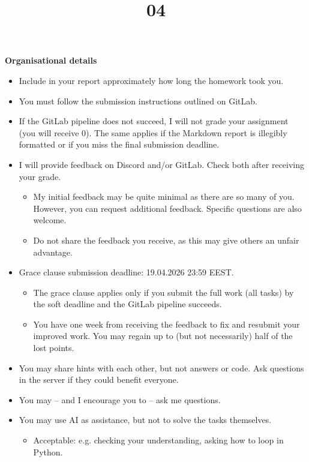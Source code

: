 \documentclass{homework}
\title{04}
\begin{document}
\maketitle

\textbf{Organisational details}

\begin{itemize}
  \item Include in your report approximately how long the homework took you.
  \item You must follow the submission instructions outlined on GitLab.
  \item If the GitLab pipeline does not succeed, I will not grade your assignment (you will receive 0).
  The same applies if the Markdown report is illegibly formatted or if you miss the final submission deadline.
  \item I will provide feedback on Discord and/or GitLab.
  Check both after receiving your grade.
  \begin{itemize}
    \item My initial feedback may be quite minimal as there are so many of you.
    However, you can request additional feedback.
    Specific questions are also welcome.
    \item Do not share the feedback you receive, as this may give others an unfair advantage.
  \end{itemize}
  \item Grace clause submission deadline: 19.04.2026 23:59 EEST.
  \begin{itemize}
    \item The grace clause applies only if you submit the full work (all tasks) by the soft deadline and the GitLab pipeline succeeds.
    \item You have one week from receiving the feedback to fix and resubmit your improved work.
    You may regain up to (but not necessarily) half of the lost points.
  \end{itemize}
  \item You may share hints with each other, but not answers or code.
  Ask questions in the server if they could benefit everyone.
  \item You may -- and I encourage you to -- ask me questions.
  \item You may use AI as assistance, but not to solve the tasks themselves.
  \begin{itemize}
    \item Acceptable: e.g. checking your understanding, asking how to loop in Python.

\end{itemize}
\end{itemize}
\end{document}
